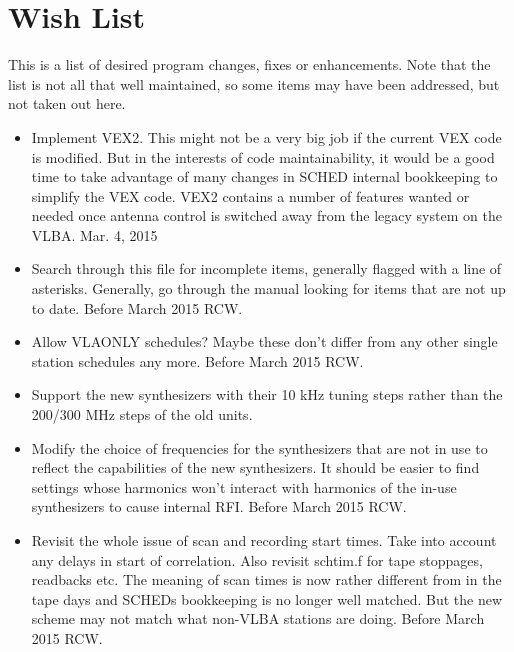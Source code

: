 \documentclass{report}
\begin{document}
\section{\label{SSEC:BUGS}Wish List}

This is a list of desired program changes, fixes or enhancements.  Note
that the list is not all that well maintained, so some items may have
been addressed, but not taken out here.


\begin{itemize}

\item Implement VEX2.  This might not be a very big job if the current VEX
      code is modified.  But in the interests of code maintainability,
      it would be a good time to take advantage of many changes in SCHED
      internal bookkeeping to simplify the VEX code.  VEX2 contains a
      number of features wanted or needed once antenna control is switched
      away from the legacy system on the VLBA.  Mar. 4, 2015

\item Search through this file for incomplete items, generally flagged
      with a line of asterisks.  Generally, go through the manual looking
      for items that are not up to date.  Before March 2015  RCW.

\item Allow VLAONLY schedules?  Maybe these don't differ from any other
      single station schedules any more. Before March 2015  RCW.

\item Support the new synthesizers with their 10 kHz tuning steps rather
      than the 200/300 MHz steps of the old units.  

\item Modify the choice of frequencies for the synthesizers that are not in
      use to reflect the capabilities of the new synthesizers.
      It should be easier to find settings whose harmonics won't interact
      with harmonics of the in-use synthesizers to cause internal RFI.
      Before March 2015  RCW.

\item Revisit the whole issue of scan and recording start times.  Take
      into account any delays in start of correlation.  Also revisit 
      schtim.f for tape stoppages, readbacks etc.  The meaning of scan 
      times is now rather different from in the tape days and SCHEDs 
      bookkeeping is no longer well matched.  But the new scheme may 
      not match what non-VLBA stations are doing.  Before March 2015  RCW.


\end{itemize}
\end{document}
